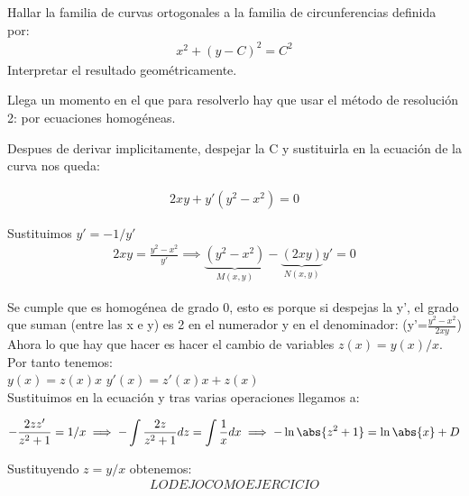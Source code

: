 \documentclass[nochap]{apuntes}
\begin{document}
\begin{problem}[10]
Hallar la familia de curvas ortogonales a la familia de circunferencias definida por:
\begin{gather*}
x^2+(y-C)^2=C^2
\end{gather*}
Interpretar el resultado geométricamente.

\solution

\begin{expla}
Llega un momento en el que para resolverlo hay que usar el método de resolución 2: por ecuaciones homogéneas.
\end{expla}

Despues de derivar implicitamente, despejar la C y sustituirla en la ecuación de la curva nos queda:

\begin{gather*}
2xy+y'(y^2-x^2)=0
\end{gather*}

Sustituimos $y'=-1/y'$
\begin{gather*}
2xy=\frac{y^2-x^2}{y'} \implies \underbrace{(y^2-x^2)}_{M(x,y)}-\underbrace{(2xy)}_{N(x,y)}y'=0 
\end{gather*}

Se cumple que es homogénea de grado 0, esto es porque si despejas la y', el grado que suman (entre las x e y) es 2 en el numerador y en el denominador: (y'=$\frac{y^2-x^2}{2xy}$) \\
Ahora lo que hay que hacer es hacer el cambio de variables $z(x)=y(x)/x$. Por tanto tenemos:\\
$y(x)=z(x)x$ \;\;\;\; $y'(x)=z'(x)x +z(x)$\\
Sustituimos en la ecuación y tras varias operaciones llegamos a:

\begin{gather*}
-\frac{2zz'}{z^2+1}=1/x \implies -\int \frac{2z}{z^2+1}dz=\int \frac{1}{x}dx \implies -\ln \abs{z^2+1}=\ln \abs{x}+D
\end{gather*}

Sustituyendo $z=y/x$ obtenemos:
\begin{gather*}
LO DEJO COMO EJERCICIO  
\end{gather*}

\end{problem}
\newpage
\end{document}
